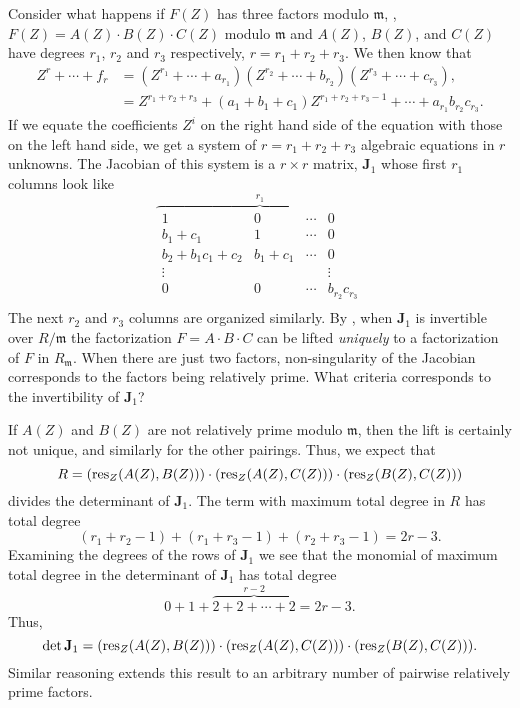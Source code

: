 Consider what happens if $F(Z)$ has three factors modulo
$\mathfrak{m}$, \ie, $F(Z) = A(Z) \cdot B(Z) \cdot C(Z)$ modulo
$\mathfrak{m}$ and $A(Z)$, $B(Z)$, and $C(Z)$ have degrees $r_1$,
$r_2$ and $r_3$ respectively, $r = r_1 + r_2 + r_3$.  We then know
that
\[
\begin{aligned}
  Z^r + \cdots + f_r&=
    (Z^{r_1} + \cdots + a_{r_{1}}) (Z^{r_2} + \cdots + b_{r_{2}})
    (Z^{r_3} + \cdots + c_{r_{3}}),\\
   &= Z^{r_1 + r_2 + r_3} + (a_{1} + b_{1} + c_{1}) Z^{r_1 + r_2 + r_3 -1} 
    + \cdots + a_{r_{1}} b_{r_{2}} c_{r_{3}}.
\end{aligned}
\]
If we equate the coefficients $Z^i$ on the right hand side of the
equation with those on the left hand side, we get a system of $r = r_1 + 
r_2 + r_3$ algebraic equations in $r$ unknowns.  The Jacobian of this 
system is a $r\times r$ matrix, $\mathbf{J}_1$ whose first $r_1$ columns 
look like 
\[
\overbrace{
\begin{array}{cccc}
1 & 0 & \cdots  & 0 \\
b_1 + c_1 & 1 & \cdots & 0\\
b_2 + b_1 c_1 + c_2 & b_1 + c_1 &  \cdots & 0 \\
\vdots & & & \vdots \\
0 & 0 & \cdots & b_{r_2} c_{r_3} \\
\end{array}}^{r_1}
\]
The next $r_2$ and $r_3$ columns are organized similarly.  By
, when $\mathbf{J}_1$ is invertible over
$R/\mathfrak{m}$ the factorization $F = A \cdot B \cdot C$ can be lifted
{\em uniquely} to a factorization of $F$ in $R_\mathfrak{m}$.  When there
are just two factors, non-singularity of the Jacobian corresponds to
the factors being relatively prime.  What criteria corresponds to the
invertibility of $\mathbf{J}_1$?

If $A(Z)$ and $B(Z)$ are not relatively prime modulo $\mathfrak{m}$, then
the lift is certainly not unique, and similarly for the other pairings.
Thus, we expect that
\[
R = (\mathop{\rm res}\nolimits_Z (A(Z), B(Z))) \cdot (\mathop{\rm res}\nolimits_Z (A(Z), C(Z))) 
  \cdot (\mathop{\rm res}\nolimits_Z (B(Z), C(Z)))
\]
divides the determinant of $\mathbf{J}_1$.  The term with maximum total 
degree in $R$ has total degree 
\[
(r_1 + r_2 - 1) + (r_1 + r_3 - 1) + (r_2 + r_3 - 1) = 2r -3.
\]
Examining the degrees of the rows of $\mathbf{J}_1$ we see that the monomial
of maximum total degree in 
the determinant of $\mathbf{J}_1$ has total degree
\[
0 + 1 + \overbrace{2 + 2 + \cdots + 2}^{r-2} = 2r -3.
\]
Thus,
\[
\det \mathbf{J}_1 = (\mathop{\rm res}\nolimits_Z (A(Z), B(Z))) \cdot (\mathop{\rm res}\nolimits_Z (A(Z), C(Z))) 
  \cdot (\mathop{\rm res}\nolimits_Z (B(Z), C(Z))).
\]
Similar reasoning extends this result to an arbitrary number of
pairwise relatively prime factors.  

